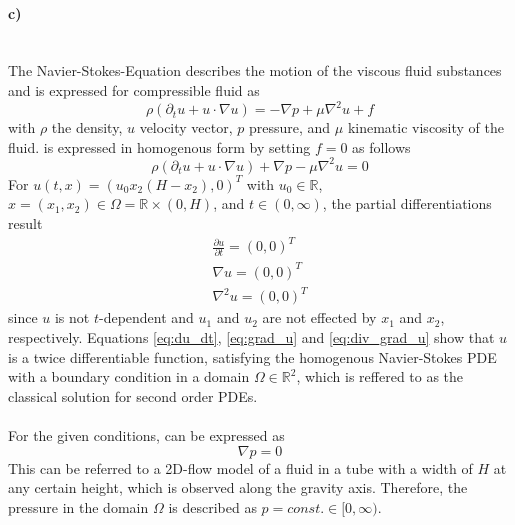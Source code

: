 \paragraph{c)}\mbox{} \\
The Navier-Stokes-Equation describes the motion of the viscous fluid substances and is expressed for compressible fluid as
\begin{equation}
	\rho(\partial_t u + u \cdot \nabla u) = - \nabla p + \mu \nabla ^2 u + f
	\label{eq:NavStokes}
\end{equation}
with $\rho$ the density, $u$ velocity vector, $p$ pressure, and $\mu$ kinematic viscosity of the fluid.
 is expressed in homogenous form by setting $f = 0$ as follows
\begin{equation}
	\rho(\partial_t u + u \cdot \nabla u) + \nabla p - \mu \nabla ^2 u = 0
	\label{eq:NavStokesHom}
\end{equation}
For $u (t,x) = (u_0 x_2 (H - x_2), 0)^T$ with $u_0 \in \mathbb{R}$, $x = (x_ 1, x_2) \in \Omega = \mathbb{R} \times (0, H)$, and $t \in (0, \infty)$, the partial differentiations result
\begin{align}
	\frac{\partial u}{\partial t} = (0,0)^T \label{eq:du_dt}   \\
	\nabla u = (0,0)^T  					\label{eq:grad_u} \\
	\nabla^2 u = (0,0)^T  					\label{eq:div_grad_u}
\end{align}
%
since $u$ is not $t$-dependent and $u_1$ and $u_2$ are not effected by $x_1$ and $x_2$, respectively.
Equations \ref{eq:du_dt}, \ref{eq:grad_u} and \ref{eq:div_grad_u} show that $u$ is a twice differentiable function, satisfying the homogenous Navier-Stokes PDE with a boundary condition in a domain $\Omega \in \mathbb{R}^2$, which is reffered to as the classical solution for second order PDEs.
\\ \\
For the given conditions,  can be expressed as
\begin{equation}
	\nabla p = 0
\end{equation}
This can be referred to a 2D-flow model of a fluid in a tube with a width of $H$ at any certain height, which is observed along the gravity axis. Therefore, the pressure in the domain $\Omega$ is described as $p = const. \in [0, \infty)$. 

